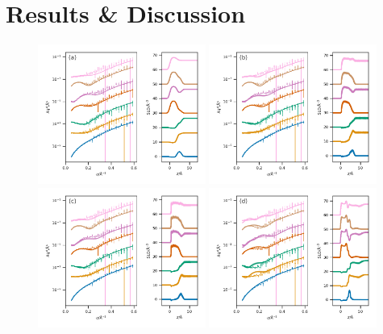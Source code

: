 \documentclass[amsmath,amssymb,twocolumn,superscriptaddress]{revtex4-1}
\begin{document}
\section{Results \& Discussion}
%
\begin{figure}
 \centering
 \includegraphics[width=0.49\textwidth]{trad_30}
 \includegraphics[width=0.49\textwidth]{sim_slipids_30} \\
 \includegraphics[width=0.49\textwidth]{sim_berger_30}
 \includegraphics[width=0.49\textwidth]{sim_martini_30}

\end{figure}
\end{document}
